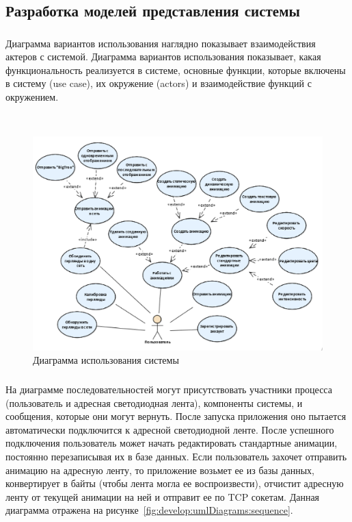 \subsection{Разработка моделей представления системы}
\label{sec:develop:umlDiagrams}

\subsubsection{}	Диаграмма вариантов использования наглядно показывает взаимодействия актеров с системой. Диаграмма вариантов использования показывает, какая функциональность реализуется в системе, основные функции, которые включены в систему (use case), их окружение (actors) и взаимодействие функций с окружением.

~
\begin{figure}[H]
\centering
	\includegraphics[scale=0.65]{figures/diagrams/uml_useCase.png}
	\caption{Диаграмма использования системы}
	\label{fig:develop:umlDiagrams:useCase}
\end{figure}

\vspace*{-\baselineskip}
\subsubsection{}	На диаграмме последовательностей могут присутствовать участники процесса (пользователь и адресная светодиодная лента), компоненты системы, и сообщения, которые они могут вернуть. После запуска приложения оно пытается автоматически подключится к адресной светодиодной ленте. После успешного подключения пользователь может начать редактировать стандартные анимации, постоянно перезаписывая их в базе данных. Если пользователь захочет отправить анимацию на адресную ленту, то приложение возьмет ее из базы данных, конвертирует в байты (чтобы лента могла ее воспроизвести), отчистит адресную ленту от текущей анимации на ней и отправит ее по TCP сокетам. Данная диаграмма отражена на рисунке~\ref{fig:develop:umlDiagrams:sequence}.

